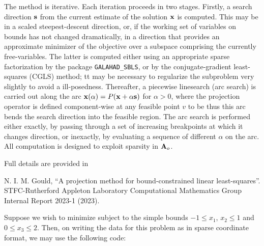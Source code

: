 \documentclass{galahad}
\begin{document}
The method is iterative. Each iteration proceeds in two stages.
Firstly, a search direction ${\mathbf{s}}$ from the current estimate of the solution
${\mathbf{x}}$ is computed. This may be in a scaled steepest-descent direction, or,
if the working set of variables on bounds has not changed dramatically,
in a direction that provides an approximate minimizer of the objective
over a subspace comprising the currently free-variables. The latter is
computed either using an appropriate sparse factorization by the
package {\tt GALAHAD\_SBLS}, or by the
conjugate-gradient least-squares (CGLS) method; tt may be necessary to
regularize the subproblem very slightly to avoid a ill-posedness.
Thereafter, a piecewise linesearch (arc search) is carried out along
the arc ${\mathbf{x}}(\alpha) = P( {\mathbf{x}} + \alpha {\mathbf{s}})$ for $\alpha > 0$,
where the projection operator
is defined component-wise at any feasible point $v$ to be
thus this arc bends the search direction into the feasible region.
The arc search is performed either exactly, by passing through a set
of increasing breakpoints at which it changes direction, or inexactly,
by evaluating a sequence of different $\alpha$  on the arc.
All computation is designed to exploit sparsity in ${\mathbf{A}}_o$.

\vspace*{1mm}

\galreferences
\vspace*{1mm}

\noindent
Full details are provided in
\vspace*{1mm}

\noindent
N. I. M. Gould,
``A projection method for bound-constrained linear least-squares''.
STFC-Rutherford Appleton Laboratory Computational Mathematics Group
Internal Report 2023-1 (2023).


\galexample
Suppose we wish to minimize
subject to the simple bounds
$-1  \leq  x_{1}$,
$x_{2} \leq 1$
and $0 \leq x_{3}  \leq  2$.
Then, on writing the data for this problem as
in sparse coordinate format, we may use the following code:
\end{document}
